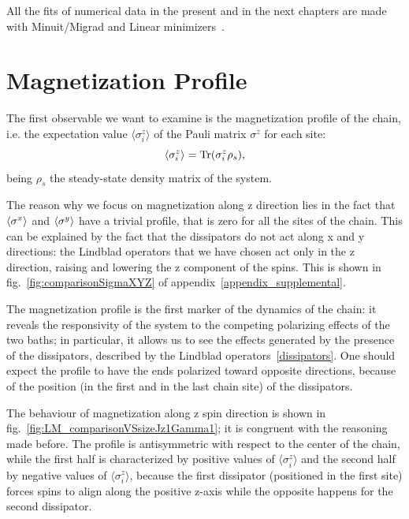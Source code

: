 All the fits of numerical data in the present and in the next chapters are made with Minuit/Migrad and Linear minimizers~\cite{root_cern}.

\section{Magnetization Profile}
\label{sec:magn_profile}
The first observable we want to examine is the magnetization profile of the chain, i.e. the expectation value $\langle \sigma_i^z \rangle$ of the Pauli matrix $\sigma^z$ for each site:
\begin{equation*}
    \langle \sigma_i^z \rangle = \operatorname{Tr}(\sigma_i^z \rho_s),
\end{equation*}
being $\rho_s$ the steady-state density matrix of the system.

The reason why we focus on magnetization along z direction lies in the fact that $\braket{\sigma^x}$ and $\braket{\sigma^y}$ have a trivial profile, that is zero for all the sites of the chain. This can be explained by the fact that the dissipators do not act along x and y directions: the Lindblad operators that we have chosen act only in the z direction, raising and lowering the z component of the spins. This is shown in fig.~\ref{fig:comparisonSigmaXYZ} of appendix~\ref{appendix_supplemental}.

The magnetization profile is the first marker of the dynamics of the chain:  it reveals the responsivity of the system to the competing polarizing effects of the two baths; in particular, it allows us to see the effects generated by the presence of the dissipators, described by the Lindblad operators~\ref{dissipators}. One should expect the profile to have the ends polarized toward opposite directions, because of the position (in the first and in the last chain site) of the dissipators.

The behaviour of magnetization along z spin direction is shown in fig.~\ref{fig:LM_comparisonVSsizeJz1Gamma1}; it is congruent with the reasoning made before. The profile is antisymmetric with respect to the center of the chain, while the first half is characterized by positive values of  $\langle \sigma_i^z \rangle$ and the second half by negative values of $\langle \sigma_i^z \rangle$, because the first dissipator (positioned in the first site) forces spins to align along the positive z-axis while the opposite happens for the second dissipator.

